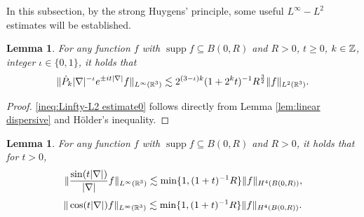 \documentclass[11pt,twoside]{article}
\def\Z{\mathop{\mathbb Z\kern 0pt}\nolimits}
\def\R{\mathop{\mathbb R\kern 0pt}\nolimits}
\def\f{\frac}
\newcommand{\pk}{\dot{P}_k}
\DeclareMathOperator{\supp}{supp}
\theoremstyle{plain}
\newtheorem{lemma}[theorem]{Lemma}
\theoremstyle{definition}
\numberwithin{equation}{section}
\begin{document}
	In this subsection, by the strong Huygens' principle,  some useful $L^\infty-L^2$ estimates will be established.
	\begin{lemma}\label{lem:Linfty-L2 estimate 0}
	For any function $f$ with $\supp f \subseteq B(0,R)$ and $R>0$, $t\ge0$,  $k\in \Z$, integer $\iota\in\{0,1\}$,
    it holds that
		\begin{equation}\label{ineq:Linfty-L2 estimate0}
			\|\pk|\nabla|^{-\iota} e^{\pm it|\nabla|}f\|_{L^\infty(\R^3)} \lesssim 2^{(3-\iota)k}(1+2^kt)^{-1}R^{\f32}\|f\|_{L^2(\R^3)}.
		\end{equation}
	\end{lemma}
	\begin{proof}
	\eqref{ineq:Linfty-L2 estimate0} follows directly from Lemma \ref{lem:linear dispersive} and H\"older's inequality.
	\end{proof}
	\begin{lemma}\label{lem:Linfty-L2 estimate}
		For any function $f$ with $\supp f \subseteq B(0,R)$ and $R>0$, it holds that for $t>0$,
		\begin{equation}\label{ineq:Linfty-L2 estimate1}
			\|\f{\sin(t|\nabla|)}{|\nabla|}f\|_{L^{\infty}(\R^3)} \lesssim \min\{1,(1+t)^{-1}R\}\| f\|_{H^{4}(B(0,R))},
		\end{equation}
		\begin{equation}\label{ineq:Linfty-L2 estimate2}
			\|\cos(t|\nabla|)f\|_{L^{\infty}(\R^3)} \lesssim  \min\{1,(1+t)^{-1}R\}\| f\|_{H^{4}(B(0,R))}.
		\end{equation}
	\end{lemma}
\end{document}
